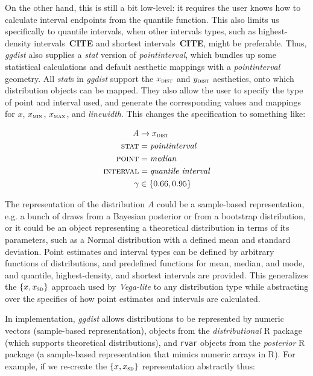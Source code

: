 \documentclass[journal]{vgtc}                     %
\begin{document}
On the other hand, this is still a bit low-level: it requires the user knows how to calculate interval endpoints from the quantile function. This also limits us specifically to quantile intervals, when other intervals types, such as highest-density intervals~\textbf{CITE} and shortest intervals~\textbf{CITE}, might be preferable. Thus, \textit{ggdist} also supplies a \textit{stat} version of \textit{pointinterval}, which bundles up some statistical calculations and default aesthetic mappings with a \textit{pointinterval} geometry. All \textit{stat}s in \textit{ggdist} support the $x_\textsc{dist}$ and $y_\textsc{dist}$ aesthetics, onto which distribution objects can be mapped. They also allow the user to specify the type of point and interval used, and generate the corresponding values and mappings for $x$, $x_\textsc{min}$, $x_\textsc{max}$, and \textit{linewidth}. This changes the specification to something like:


\begin{align*}
A &\rightarrow x_\textsc{dist}\\
\textsc{stat} &= \mathit{pointinterval}\\
\textsc{point} &= \mathit{median}\\
\textsc{interval} &= \textit{quantile interval}\\
\gamma &\in \{0.66, 0.95\}
\end{align*}

The representation of the distribution $A$ could be a sample-based representation, e.g. a bunch of draws from a Bayesian posterior or from a bootstrap distribution, or it could be an object representing a theoretical distribution in terms of its parameters, such as a Normal distribution with a defined mean and standard deviation. Point estimates and interval types can be defined by arbitrary functions of distributions, and predefined functions for mean, median, and mode, and quantile, highest-density, and shortest intervals are provided. This generalizes the $\{x, x_\textsc{sd}\}$ approach used by \textit{Vega-lite} to any distribution type while abstracting over the specifics of how point estimates and intervals are calculated.

In implementation, \textit{ggdist} allows distributions to be represented by numeric vectors (sample-based representation), objects from the \textit{distributional } R package (which supports theoretical distributions), and \texttt{rvar} objects from the \textit{posterior} R package (a sample-based representation that mimics numeric arrays in R). For example, if we re-create the $\{x, x_\textsc{sd}\}$ representation abstractly thus:
\end{document}

